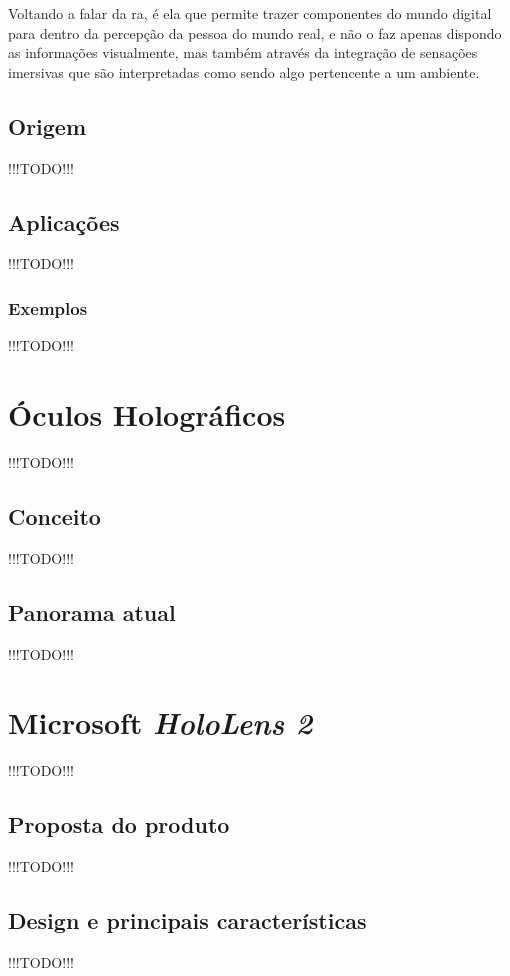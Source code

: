 \documentclass{report}
\begin{document}
Voltando a falar da \ac{ra}, é ela que permite trazer componentes do mundo digital para dentro da percepção da pessoa do mundo real, e não o faz apenas dispondo as informações visualmente, mas também através da integração de sensações imersivas que são interpretadas como sendo algo pertencente a um ambiente.

\section{Origem}
!!!TODO!!!

\section{Aplicações}
!!!TODO!!!

\subsection{Exemplos}
!!!TODO!!!

\chapter{Óculos Holográficos}
\label{chap.oculos-holograficos}
!!!TODO!!!

\section{Conceito}
!!!TODO!!!

\section{Panorama atual}
!!!TODO!!!

\chapter{Microsoft \textit{HoloLens 2}}
\label{chap.microsoft-hololens-2}
!!!TODO!!!

\section{Proposta do produto}
!!!TODO!!!

\section{Design e principais características}
!!!TODO!!!
\end{document}
